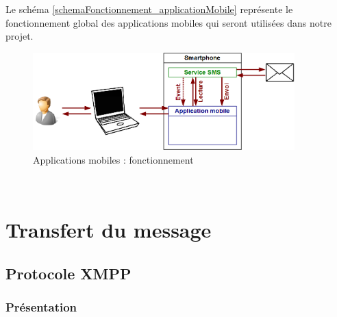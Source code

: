 Le schéma \ref{schemaFonctionnement_applicationMobile} représente le fonctionnement global des applications mobiles qui seront utilisées dans notre projet.
\begin{figure}[!h]
	\center
	\includegraphics[width=0.9\textwidth]{img/schemaFonctionnement_applicationMobile.png}
	\caption{Applications mobiles : fonctionnement}
	\label{schemaFonctionnement_siteWeb_reception}
\end{figure}
~~\\







\section{Transfert du message}


\subsection{Protocole XMPP}


\subsubsection{Présentation}

